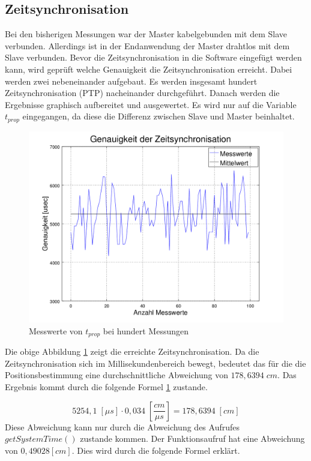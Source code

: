 \subsection{Zeitsynchronisation}
Bei den bisherigen Messungen war der Master kabelgebunden mit dem Slave verbunden. Allerdings ist in der Endanwendung der Master drahtlos mit dem Slave verbunden. Bevor die Zeitsynchronisation in die Software eingefügt werden kann, wird geprüft welche Genauigkeit die Zeitsynchronisation erreicht. Dabei werden zwei \board \platz nebeneinander aufgebaut. Es werden insgesamt hundert Zeitsynchronisation (PTP) nacheinander durchgeführt. Danach werden die Ergebnisse graphisch aufbereitet und ausgewertet. Es wird nur auf die Variable $t_{prop}$ eingegangen, da diese die Differenz zwischen Slave und Master beinhaltet. 
\begin{figure}[H]
        \centering
        \hspace*{-1.7cm}
        \includegraphics[width=1.2\textwidth]{images/zeit_sync_t_prop_figure.png}
        \caption{Messwerte von $t_{prop}$ bei hundert Messungen}
        \label{img:zeit_sync_t_prop_figure}
\end{figure}
Die obige Abbildung \ref{img:zeit_sync_t_prop_figure} zeigt die erreichte Zeitsynchronisation. Da die Zeitsynchronisation sich im Millisekundenbereich bewegt, bedeutet das für die die Positionsbestimmung eine durchschnittliche Abweichung von $178,6394 \;cm$. Das Ergebnis kommt durch die folgende Formel \ref{img:zeit_sync_t_prop_figure} zustande.

\begin{equation}\label{eq:durchschnittsabweichung_t_prop}
5254,1 \;[\mu s] \cdot 0,034 \; [\frac{cm}{\mu s}] = 178,6394 \;[cm]
\end{equation}
Diese Abweichung kann nur durch die Abweichung des Aufrufes $getSystemTime()$ zustande kommen. Der Funktionsaufruf hat eine Abweichung von $0,49028 [\si{cm}]$. Dies wird durch die folgende Formel erklärt.

